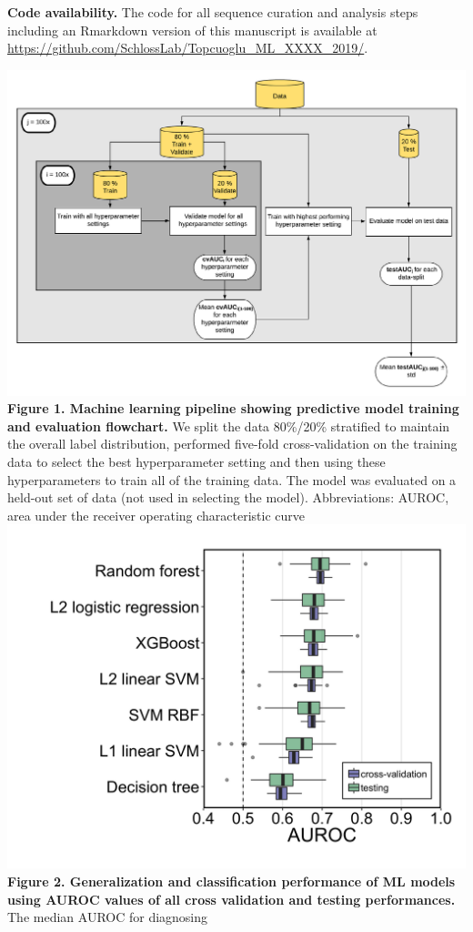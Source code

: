 \documentclass[11pt,]{article}
\begin{document}
\textbf{Code availability.} The code for all sequence curation and
analysis steps including an Rmarkdown version of this manuscript is
available at
\url{https://github.com/SchlossLab/Topcuoglu_ML_XXXX_2019/}.

\newpage

\includegraphics{Figure_1} \textbf{Figure 1. Machine learning pipeline
showing predictive model training and evaluation flowchart. } We split
the data 80\%/20\% stratified to maintain the overall label
distribution, performed five-fold cross-validation on the training data
to select the best hyperparameter setting and then using these
hyperparameters to train all of the training data. The model was
evaluated on a held-out set of data (not used in selecting the model).
Abbreviations: AUROC, area under the receiver operating characteristic
curve \newpage
\includegraphics{Figure_2.png} \textbf{Figure 2. Generalization and
classification performance of ML models using AUROC values of all cross
validation and testing performances. } The median AUROC for diagnosing
\end{document}
